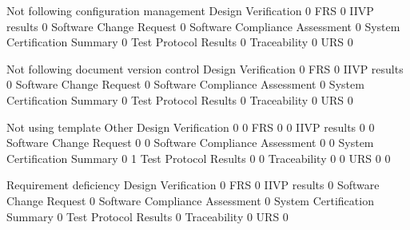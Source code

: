 \documentclass{article}
\begin{document}
\begin{Schunk}
\begin{Soutput}
                                 Not following configuration management
  Design Verification                                                 0
  FRS                                                                 0
  IIVP results                                                        0
  Software Change Request                                             0
  Software Compliance Assessment                                      0
  System Certification Summary                                        0
  Test Protocol Results                                               0
  Traceability                                                        0
  URS                                                                 0
                                
                                 Not following document version control
  Design Verification                                                 0
  FRS                                                                 0
  IIVP results                                                        0
  Software Change Request                                             0
  Software Compliance Assessment                                      0
  System Certification Summary                                        0
  Test Protocol Results                                               0
  Traceability                                                        0
  URS                                                                 0
                                
                                 Not using template Other
  Design Verification                             0     0
  FRS                                             0     0
  IIVP results                                    0     0
  Software Change Request                         0     0
  Software Compliance Assessment                  0     0
  System Certification Summary                    0     1
  Test Protocol Results                           0     0
  Traceability                                    0     0
  URS                                             0     0
                                
                                 Requirement deficiency
  Design Verification                                 0
  FRS                                                 0
  IIVP results                                        0
  Software Change Request                             0
  Software Compliance Assessment                      0
  System Certification Summary                        0
  Test Protocol Results                               0
  Traceability                                        0
  URS                                                 0
\end{Soutput}
\end{Schunk}
\end{document}
